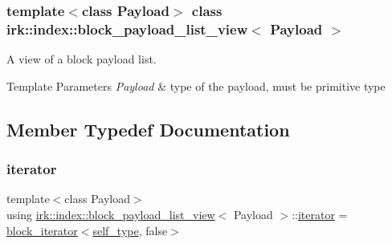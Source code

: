 \subsubsection*{template$<$class Payload$>$\newline
class irk\+::index\+::block\+\_\+payload\+\_\+list\+\_\+view$<$ Payload $>$}

A view of a block payload list. 


\begin{DoxyTemplParams}{Template Parameters}
{\em Payload} & type of the payload, must be primitive type \\
\hline
\end{DoxyTemplParams}


\subsection{Member Typedef Documentation}
\mbox{\label{classirk_1_1index_1_1block__payload__list__view_a3cbb6ab331804c87e830be1380a3c2b2}} 
\subsubsection{\texorpdfstring{iterator}{iterator}}
{\footnotesize\ttfamily template$<$class Payload$>$ \\
using \mbox{\hyperlink{classirk_1_1index_1_1block__payload__list__view}{irk\+::index\+::block\+\_\+payload\+\_\+list\+\_\+view}}$<$ Payload $>$\+::\mbox{\hyperlink{classirk_1_1index_1_1block__payload__list__view_a3cbb6ab331804c87e830be1380a3c2b2}{iterator}} =  \mbox{\hyperlink{classirk_1_1index_1_1block__iterator}{block\+\_\+iterator}}$<$\mbox{\hyperlink{classirk_1_1index_1_1block__payload__list__view_a29e1995bbc64a8512bacf6c110f24f9e}{self\+\_\+type}}, false$>$}

\mbox{\label{classirk_1_1index_1_1block__payload__list__view_a29e1995bbc64a8512bacf6c110f24f9e}} 
